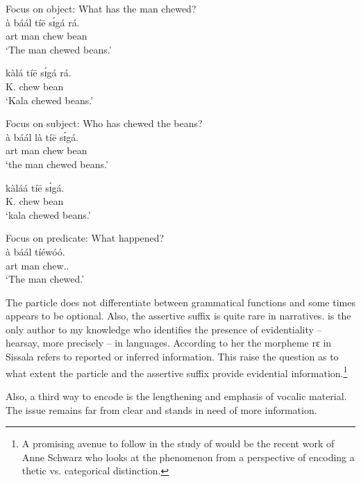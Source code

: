\begin{exe}
\begin{exe}
\begin{exe}
\begin{exe}
\begin{exe}
\begin{exe}
\begin{exe}
\begin{exe}
\begin{exe}
\begin{exe}
\begin{exe}
\begin{exe}
\newpage 
 \ea\label{ex:GRM-focus-obj}{\rm Focus on object: What has the man chewed?}\\
\gll   à báál tíē sɪ́gá rá.\\
   {\sc art} man chew bean {\foc}\\
\glt `The man chewed {\sc beans}.'

\gll  kàlá tíē sɪ́gá rá.\\
   K.   chew bean {\foc}\\
\glt `Kala chewed {\sc beans}.'

\ex\label{ex:GRM-focus-subj}{\rm Focus on subject: Who has chewed the beans?}\\
\gll   à báál là  tíē sɪ́gá.\\
    {\sc art} man {\foc} chew bean\\
\glt `{\sc the man} chewed beans.'



\gll  kàláá tíē sɪ́gá.\\
   K.   chew bean\\
\glt `{\sc kala} chewed beans.'

\ex\label{ex:GRM-focus-pred}{\rm Focus on predicate: What happened?}\\
\gll à báál tíéwóó.\\
   {\sc art} man chew.{\pfv .\foc}\\
\glt `The man {\sc chewed}.'


\z 
 \z
 
 
The  particle does not differentiate between  grammatical functions and some times appears to be optional.  Also,  the assertive suffix is quite rare in narratives.  \citet[94]{blas90} is the only author to my knowledge who identifies the presence  of  evidentiality --  hearsay, more precisely -- in  languages. According to her the morpheme {\sls rɛ} in Sissala refers to reported or inferred information. This raise the question as to what extent the  particle and the assertive suffix provide evidential information.\footnote{A promising avenue to follow in the study of  would be the recent work of Anne Schwarz  who looks at the phenomenon from a perspective of encoding a thetic vs. categorical distinction.}

Also, a third way to encode  is the lengthening and emphasis of vocalic material. The issue remains far from clear and stands in need of more information.

\ea\label{ex:focus-length}


\end{exe}
\end{exe}
\end{exe}
\end{exe}
\end{exe}
\end{exe}
\end{exe}
\end{exe}
\end{exe}
\end{exe}
\end{exe}
\end{exe}
